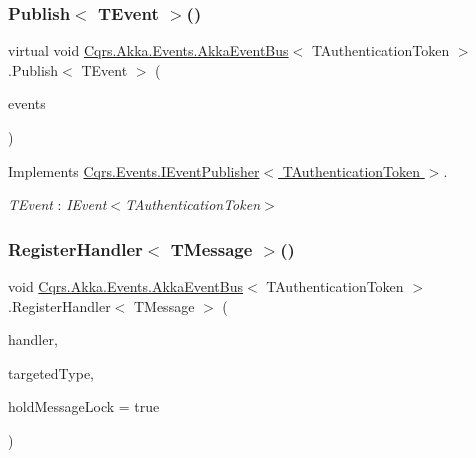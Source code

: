 \subsubsection{\texorpdfstring{Publish$<$ T\+Event $>$()}{Publish< TEvent >()}\hspace{0.1cm}{\footnotesize\ttfamily [2/2]}}
{\footnotesize\ttfamily virtual void \hyperlink{classCqrs_1_1Akka_1_1Events_1_1AkkaEventBus}{Cqrs.\+Akka.\+Events.\+Akka\+Event\+Bus}$<$ T\+Authentication\+Token $>$.Publish$<$ T\+Event $>$ (\begin{DoxyParamCaption}\item[{I\+Enumerable$<$ T\+Event $>$}]{events }\end{DoxyParamCaption})\hspace{0.3cm}{\ttfamily [virtual]}}



Implements \hyperlink{interfaceCqrs_1_1Events_1_1IEventPublisher_a2cbcc3d2c24d015abef6337714ec51ff}{Cqrs.\+Events.\+I\+Event\+Publisher$<$ T\+Authentication\+Token $>$}.

\begin{Desc}
\item[Type Constraints]\begin{description}
\item[{\em T\+Event} : {\em I\+Event$<$T\+Authentication\+Token$>$}]\end{description}
\end{Desc}
\mbox{\label{classCqrs_1_1Akka_1_1Events_1_1AkkaEventBus_a59ec3e497e511b73b5239eee80691443}} 
\subsubsection{\texorpdfstring{Register\+Handler$<$ T\+Message $>$()}{RegisterHandler< TMessage >()}\hspace{0.1cm}{\footnotesize\ttfamily [1/2]}}
{\footnotesize\ttfamily void \hyperlink{classCqrs_1_1Akka_1_1Events_1_1AkkaEventBus}{Cqrs.\+Akka.\+Events.\+Akka\+Event\+Bus}$<$ T\+Authentication\+Token $>$.Register\+Handler$<$ T\+Message $>$ (\begin{DoxyParamCaption}\item[{Action$<$ T\+Message $>$}]{handler,  }\item[{Type}]{targeted\+Type,  }\item[{bool}]{hold\+Message\+Lock = {\ttfamily true} }\end{DoxyParamCaption})}



